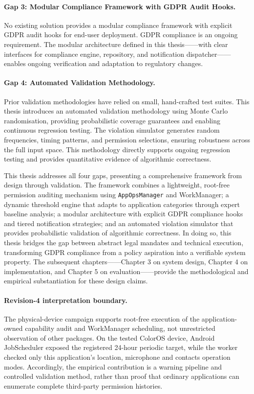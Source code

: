 \paragraph{Gap 3: Modular Compliance Framework with GDPR Audit Hooks.} No existing solution provides a modular compliance framework with explicit GDPR audit hooks for end-user deployment. GDPR compliance is an ongoing requirement. The modular architecture defined in this thesis——with clear interfaces for compliance engine, repository, and notification dispatcher——enables ongoing verification and adaptation to regulatory changes.

\paragraph{Gap 4: Automated Validation Methodology.} Prior validation methodologies have relied on small, hand-crafted test suites. This thesis introduces an automated validation methodology using Monte Carlo randomisation, providing probabilistic coverage guarantees and enabling continuous regression testing. The violation simulator generates random frequencies, timing patterns, and permission selections, ensuring robustness across the full input space. This methodology directly supports ongoing regression testing and provides quantitative evidence of algorithmic correctness.

This thesis addresses all four gaps, presenting a comprehensive framework from design through validation. The framework combines a lightweight, root-free permission auditing mechanism using \texttt{AppOpsManager} and WorkManager; a dynamic threshold engine that adapts to application categories through expert baseline analysis; a modular architecture with explicit GDPR compliance hooks and tiered notification strategies; and an automated violation simulator that provides probabilistic validation of algorithmic correctness. In doing so, this thesis bridges the gap between abstract legal mandates and technical execution, transforming GDPR compliance from a policy aspiration into a verifiable system property. The subsequent chapters——Chapter 3 on system design, Chapter 4 on implementation, and Chapter 5 on evaluation——provide the methodological and empirical substantiation for these design claims.
\paragraph{Revision-4 interpretation boundary.}
The physical-device campaign supports root-free execution of the application-owned capability audit and WorkManager scheduling, not unrestricted observation of other packages. On the tested ColorOS device, Android JobScheduler exposed the registered 24-hour periodic target, while the worker checked only this application's location, microphone and contacts operation modes. Accordingly, the empirical contribution is a warning pipeline and controlled validation method, rather than proof that ordinary applications can enumerate complete third-party permission histories.

